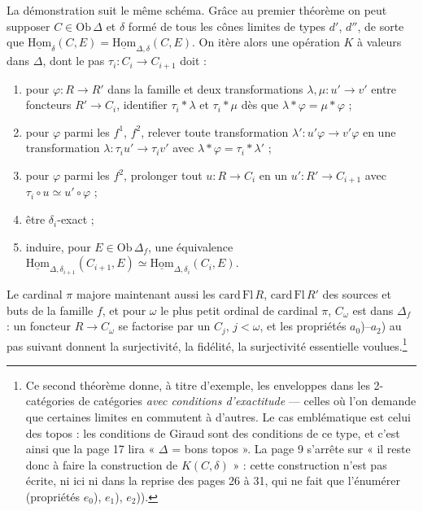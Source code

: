 \documentclass[11pt,a4paper]{article}
\begin{document}
La démonstration suit le même schéma. Grâce au premier théorème on peut
supposer $C \in \mathrm{Ob}\,\Delta$ et $\delta$ formé de tous les cônes
limites de types $d'$, $d''$, de sorte que
$\underline{\mathrm{Hom}}_{\delta}(C, E) =
\underline{\mathrm{Hom}}_{\Delta,\delta}(C, E)$. On itère alors une
opération $K$ à valeurs dans $\Delta$, dont le pas $\tau_{i} : C_{i} \to
C_{i+1}$ doit :
\begin{enumerate}
\item[$a_{0}$)] pour $\varphi : R \to R'$ dans la famille et deux
transformations $\lambda, \mu : u' \to v'$ entre foncteurs $R' \to C_{i}$,
identifier $\tau_{i} * \lambda$ et $\tau_{i} * \mu$ dès que $\lambda *
\varphi = \mu * \varphi$ ;
\item[$a_{1}$)] pour $\varphi$ parmi les $f^{1}$, $f^{2}$, relever toute
transformation $\lambda' : u'\varphi \to v'\varphi$ en une transformation
$\lambda : \tau_{i} u' \to \tau_{i} v'$ avec $\lambda * \varphi = \tau_{i} *
\lambda'$ ;
\item[$a_{2}$)] pour $\varphi$ parmi les $f^{2}$, prolonger tout $u : R \to
C_{i}$ en un $u' : R' \to C_{i+1}$ avec $\tau_{i} \circ u \simeq u' \circ
\varphi$ ;
\item[b)] être $\delta_{i}$-exact ;
\item[c)] induire, pour $E \in \mathrm{Ob}\,\Delta_{f}$, une équivalence
$\underline{\mathrm{Hom}}_{\Delta,\delta_{i+1}}(C_{i+1}, E) \simeq
\underline{\mathrm{Hom}}_{\Delta,\delta_{i}}(C_{i}, E)$.
\end{enumerate}
Le cardinal $\pi$ majore maintenant aussi les $\mathrm{card}\,\mathrm{Fl}\,
R$, $\mathrm{card}\,\mathrm{Fl}\,R'$ des sources et buts de la famille $f$,
et pour $\omega$ le plus petit ordinal de cardinal $\pi$, $C_{\omega}$ est
dans $\Delta_{f}$ : un foncteur $R \to C_{\omega}$ se factorise par un
$C_{j}$, $j < \omega$, et les propriétés $a_{0}$)--$a_{2}$) au pas suivant
donnent la surjectivité, la fidélité, la surjectivité essentielle
voulues.\footnote{Ce second théorème donne, à titre d'exemple, les enveloppes
dans les 2-catégories de catégories \emph{avec conditions d'exactitude} —
celles où l'on demande que certaines limites en commutent à d'autres. Le
cas emblématique est celui des topos : les conditions de Giraud sont des
conditions de ce type, et c'est ainsi que la page 17 lira « $\Delta$ = bons
topos ». La page 9 s'arrête sur « il reste donc à faire la construction de
$K(C, \delta)$ » : cette construction n'est pas écrite, ni ici ni dans la
reprise des pages 26 à 31, qui ne fait que l'énumérer (propriétés
$e_{0}$), $e_{1}$), $e_{2}$)).}
\end{document}
